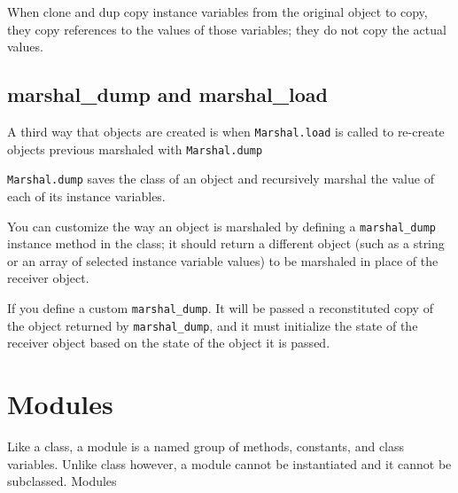 \documentclass[11pt, a4paper]{book}
\begin{document}
When clone and dup copy instance variables from the original object to copy,
they copy references to the values of those variables; they do not copy the
actual values.

\subsection{marshal\_dump and marshal\_load}
A third way that objects are created is when \verb|Marshal.load| is called to
re-create objects previous marshaled with \verb|Marshal.dump|

\verb|Marshal.dump| saves the class of an object and recursively marshal the
value of each of its instance variables.

You can customize the way an object is marshaled by defining a
\verb|marshal_dump| instance method in the class; it should return a different
object (such as a string or an array of selected instance variable values) to be
marshaled in place of the receiver object.

If you define a custom \verb|marshal_dump|. It will be passed a reconstituted
copy of the object returned by \verb|marshal_dump|, and it must initialize the
state of the receiver object based on the state of the object it is passed.

\section{Modules}
Like a class, a module is a named group of methods, constants, and class
variables. Unlike class however, a module cannot be instantiated and it cannot
be subclassed. Modules
\end{document}
